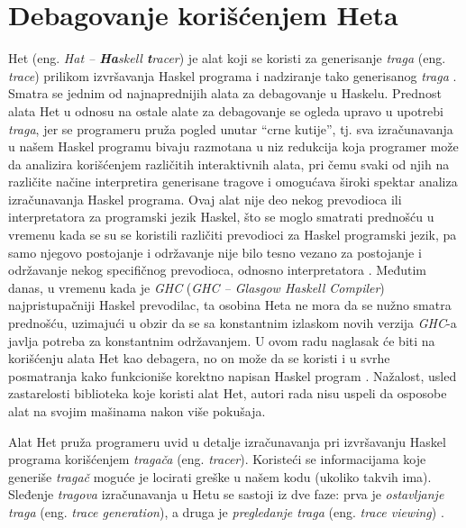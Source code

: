 \documentclass[a4paper]{article}
\begin{document}
{{\section{Debagovanje korišćenjem Heta}
Het (eng. {\em Hat -- {\bf \em Ha}skell {\bf \em t}racer}) je alat koji se koristi za generisanje {\em traga} (eng. {\em trace}) prilikom izvršavanja Haskel programa
i nadziranje tako generisanog {\em traga} \cite{chitil2002transforming}. Smatra se jednim od najnaprednijih alata za debagovanje u Haskelu. Prednost alata Het u odnosu na ostale alate za debagovanje 
se ogleda upravo u upotrebi {\em traga}, jer se programeru pruža pogled unutar ``crne kutije'', tj. sva izračunavanja u našem Haskel programu bivaju razmotana u niz redukcija koja programer može da analizira korišćenjem različitih interaktivnih alata, pri čemu svaki od njih na različite načine interpretira generisane tragove i omogućava široki spektar analiza izračunavanja Haskel programa.
Ovaj alat nije deo nekog prevodioca ili interpretatora za programski jezik Haskel,
što se moglo smatrati prednošću u vremenu kada se su se koristili različiti prevodioci za Haskel programski jezik, pa samo njegovo postojanje i održavanje nije bilo tesno vezano za postojanje i održavanje nekog specifičnog prevodioca, odnosno interpretatora \cite{chitil2002transforming}. Međutim danas, u vremenu kada je {\em GHC} ({\em GHC -- Glasgow Haskell Compiler}) najpristupačniji Haskel prevodilac, ta osobina Heta ne mora da se nužno smatra prednošću, uzimajući u obzir da se sa konstantnim izlaskom novih verzija {\em GHC}-a javlja potreba za konstantnim održavanjem.
U ovom radu naglasak će biti na korišćenju alata Het kao debagera, no on može da se koristi i u svrhe posmatranja kako funkcioniše korektno napisan Haskel program \cite{wallace2001multiple}.
Nažalost, usled zastarelosti biblioteka koje koristi alat Het, autori rada nisu uspeli da osposobe alat na svojim mašinama nakon više pokušaja. 

Alat Het pruža programeru uvid u detalje izračunavanja pri izvršavanju Haskel programa korišćenjem {\em tragača} (eng. {\em tracer}). 
Koristeći se informacijama koje generiše {\em tragač} moguće je locirati greške u našem kodu (ukoliko takvih ima).
Sleđenje {\em tragova} izračunavanja u Hetu se sastoji iz dve faze: prva je {\em ostavljanje traga} (eng. {\em trace generation}), a druga je {\em pregledanje traga} (eng. {\em trace viewing}) \cite{chitil2002transforming}.

}}
\end{document}
